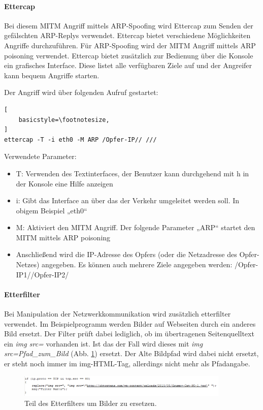 \paragraph*{Ettercap}

Bei diesem MITM Angriff mittels ARP-Spoofing wird Ettercap zum Senden der gefälschten ARP-Replys verwendet. Ettercap bietet verschiedene Möglichkeiten Angriffe durchzuführen. Für ARP-Spoofing wird der MITM Angriff mittels ARP poisoning verwendet.
Ettercap bietet zusätzlich zur Bedienung über die Konsole ein grafisches Interface. Diese listet alle verfügbaren Ziele auf und der Angreifer kann bequem Angriffe starten.

Der Angriff wird über folgenden Aufruf gestartet:
\lstset{language=bash}
\begin{lstlisting}[
	basicstyle=\footnotesize,
]
ettercap -T -i eth0 -M ARP /Opfer-IP// ///
\end{lstlisting}

Verwendete Parameter:
\begin{itemize}
	\item T: Verwenden des Textinterfaces, der Benutzer kann durchgehend mit h in der Konsole eine Hilfe anzeigen
	\item i: Gibt das Interface an über das der Verkehr umgeleitet werden soll. In obigem Beispiel „eth0“
	\item M: Aktiviert den MITM Angriff. Der folgende Parameter „ARP“ startet den MITM mittels ARP poisoning
	\item Anschließend wird die IP-Adresse des Opfers (oder die Netzadresse des Opfer-Netzes) angegeben. Es können auch mehrere Ziele angegeben werden: /Opfer-IP1//Opfer-IP2/ 
\end{itemize}

\paragraph*{Etterfilter}
Bei Manipulation der Netzwerkkommunikation wird zusätzlich etterfilter verwendet. Im Beispielprogramm werden Bilder auf Webseiten durch ein anderes Bild ersetzt. Der Filter prüft dabei lediglich, ob im übertragenen Seitenquelltext ein \textit{img src=} vorhanden ist. Ist das der Fall wird dieses mit \textit{img src=Pfad\_zum\_Bild} (Abb. \ref{fig:etterfilter}) ersetzt. Der Alte Bildpfad wird dabei nicht ersetzt, er steht noch immer im img-HTML-Tag, allerdings nicht mehr als Pfadangabe.
\begin{figure}[h!]
	\centering
		\includegraphics[width=0.90\textwidth]{bilder/arpSpoofing/etterfilter.pdf}
	\caption{Teil des Etterfilters um Bilder zu ersetzen.}
	\label{fig:etterfilter}
\end{figure}

